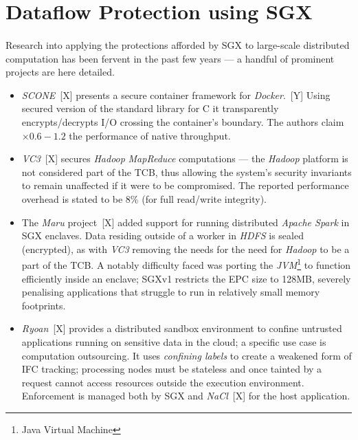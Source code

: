 \section{Dataflow Protection using SGX}
\paragraph{} Research into applying the protections afforded by SGX to large-scale distributed computation has been fervent in the past few years --- a handful of prominent projects are here detailed. 

\begin{itemize}
    \item \textit{SCONE}~[X] presents a secure container framework for \textit{Docker}.~[Y] Using secured version of the standard library for C it transparently encrypts/decrypts I/O crossing the container's boundary. The authors claim $\times 0.6-1.2$ the performance of native throughput.
    \item \textit{VC3}~[X] secures \textit{Hadoop} \textit{MapReduce} computations --- the \textit{Hadoop} platform is not considered part of the TCB, thus allowing the system's security invariants to remain unaffected if it were to be compromised. The reported performance overhead is stated to be 8\% (for full read/write integrity).
    \item The \textit{Maru} project~[X] added support for running distributed \textit{Apache Spark} in SGX enclaves. Data residing outside of a worker in \textit{HDFS} is sealed (encrypted), as with \textit{VC3} removing the needs for the need for \textit{Hadoop} to be a part of the TCB. A notably difficulty faced was porting the \textit{JVM}\footnote{Java Virtual Machine} to function efficiently inside an enclave; SGXv1 restricts the EPC size to 128MB, severely penalising applications that struggle to run in relatively small memory footprints.
    \item \textit{Ryoan}~[X] provides a distributed sandbox environment to confine untrusted applications running on sensitive data in the cloud; a specific use case is computation outsourcing. It uses \textit{confining labels} to create a weakened form of IFC tracking; processing nodes must be stateless and once tainted by a request cannot access resources outside the execution environment. Enforcement is managed both by SGX and \textit{NaCl}~[X] for the host application. 
\end{itemize}


